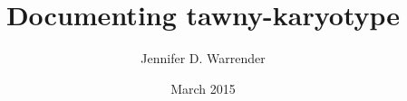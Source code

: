 \documentclass{article}
\begin{document}
\title{Documenting tawny-karyotype}

\author{Jennifer D. Warrender}

\date{March 2015}

\maketitle





\begin{sloppypar}

% 
% 
% 
% 
% 
% 
% 
% 

% 
\end{sloppypar}


\begin{appendix}

% 
% 
% 
% 

\end{appendix}


\renewcommand{\bibname}{References}

\begin{singlespace}
\pagestyle{plain}

\end{singlespace}
\end{document}
